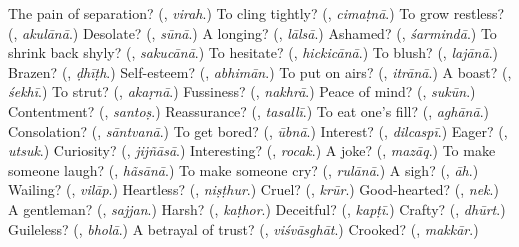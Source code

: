 \begin{tcolorbox}[breakable,colback=teal!4,colframe=teal!35!black,title={Before you move on}]
The pain of separation? (\textbf{}, \emph{virah}.) To cling tightly? (\textbf{}, \emph{cimaṭnā}.) To grow restless? (\textbf{}, \emph{akulānā}.) Desolate? (\textbf{}, \emph{sūnā}.) A longing? (\textbf{}, \emph{lālsā}.) Ashamed? (\textbf{}, \emph{śarmindā}.) To shrink back shyly? (\textbf{}, \emph{sakucānā}.) To hesitate? (\textbf{}, \emph{hickicānā}.) To blush? (\textbf{}, \emph{lajānā}.) Brazen? (\textbf{}, \emph{ḍhīṭh}.) Self-esteem? (\textbf{}, \emph{abhimān}.) To put on airs? (\textbf{}, \emph{itrānā}.) A boast? (\textbf{}, \emph{śekhī}.) To strut? (\textbf{}, \emph{akaṛnā}.) Fussiness? (\textbf{}, \emph{nakhrā}.) Peace of mind? (\textbf{}, \emph{sukūn}.) Contentment? (\textbf{}, \emph{santoṣ}.) Reassurance? (\textbf{}, \emph{tasallī}.) To eat one's fill? (\textbf{}, \emph{aghānā}.) Consolation? (\textbf{}, \emph{sāntvanā}.) To get bored? (\textbf{}, \emph{ūbnā}.) Interest? (\textbf{}, \emph{dilcaspī}.) Eager? (\textbf{}, \emph{utsuk}.) Curiosity? (\textbf{}, \emph{jijñāsā}.) Interesting? (\textbf{}, \emph{rocak}.) A joke? (\textbf{}, \emph{mazāq}.) To make someone laugh? (\textbf{}, \emph{hãsānā}.) To make someone cry? (\textbf{}, \emph{rulānā}.) A sigh? (\textbf{}, \emph{āh}.) Wailing? (\textbf{}, \emph{vilāp}.) Heartless? (\textbf{}, \emph{niṣṭhur}.) Cruel? (\textbf{}, \emph{krūr}.) Good-hearted? (\textbf{}, \emph{nek}.) A gentleman? (\textbf{}, \emph{sajjan}.) Harsh? (\textbf{}, \emph{kaṭhor}.) Deceitful? (\textbf{}, \emph{kapṭī}.) Crafty? (\textbf{}, \emph{dhūrt}.) Guileless? (\textbf{}, \emph{bholā}.) A betrayal of trust? (\textbf{}, \emph{viśvāsghāt}.) Crooked? (\textbf{}, \emph{makkār}.)
\end{tcolorbox}
